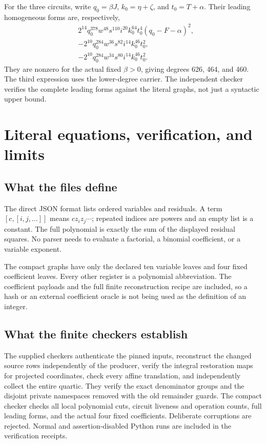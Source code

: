 \documentclass[11pt,letterpaper]{article}
\theoremstyle{definition}\newtheorem{definition}[theorem]{Definition}
\theoremstyle{remark}\newtheorem{remark}[theorem]{Remark}
\begin{document}
For the three circuits, write \(q_0=\beta J\), \(k_0=\eta+\zeta\), and \(t_0=T+\alpha\). Their leading homogeneous forms are, respectively,
\begin{align*}
 &2^{14}q_0^{378}w^{48}s^{110}i^{20}k_0^{64}t_0^4
       (q_0-F-\alpha)^2,\\
 &-2^{10}q_0^{284}w^{36}s^{82}i^{14}k_0^{46}t_0^2,\\
 &-2^{10}q_0^{284}w^{34}s^{80}i^{14}k_0^{46}t_0^2.
\end{align*}
They are nonzero for the actual fixed \(\beta>0\), giving degrees 626, 464, and 460. The third expression uses the lower-degree carrier. The independent checker verifies the complete leading forms against the literal graphs, not just a syntactic upper bound.

\section{Literal equations, verification, and limits}\label{sec:verification}

\subsection{What the files define}
The direct JSON format lists ordered variables and residuals. A term \([c,[i,j,\ldots]]\) means \(c z_i z_j\cdots\); repeated indices are powers and an empty list is a constant. The full polynomial is exactly the sum of the displayed residual squares. No parser needs to evaluate a factorial, a binomial coefficient, or a variable exponent.

The compact graphs have only the declared ten variable leaves and four fixed coefficient leaves. Every other register is a polynomial abbreviation. The coefficient payloads and the full finite reconstruction recipe are included, so a hash or an external coefficient oracle is not being used as the definition of an integer.

\subsection{What the finite checkers establish}
The supplied checkers authenticate the pinned inputs, reconstruct the changed source rows independently of the producer, verify the integral restoration maps for projected coordinates, check every affine translation, and independently collect the entire quartic. They verify the exact denominator groups and the disjoint private namespaces removed with the old remainder guards. The compact checker checks all local polynomial cuts, circuit liveness and operation counts, full leading forms, and the actual four fixed coefficients. Deliberate corruptions are rejected. Normal and assertion-disabled Python runs are included in the verification receipts.
\end{document}
